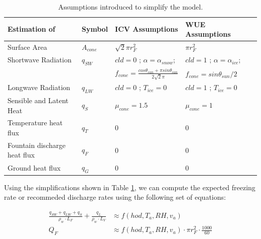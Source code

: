 \documentclass[tc, manuscript]{copernicus}
\begin{document}
\begin{table}[]
\centering
\caption{Assumptions introduced to simplify the model.}
\label{tab:assumptions}
\begin{tabular}{@{}lllll@{}}
\toprule
\textbf{Estimation of} & \textbf{Symbol} & \textbf{ICV Assumptions} & \textbf{WUE Assumptions} & \\ \midrule
\multicolumn{1}{|l}{Surface Area}        & $A_{cone}$ & $ \sqrt{2} \pi r_{F}^2$ & $\pi r_{F}^2$ & \multicolumn{1}{l|}{} \\ \midrule
\multicolumn{1}{|l}{Shortwave Radiation} & $q_{SW}$ & $cld = 0$ ; $\alpha=\alpha_{snow}$; & $cld = 1$ ;
$\alpha=\alpha_{ice}$; & \multicolumn{1}{l|}{} \\ 
\multicolumn{1}{|l}{ } &  & $f_{cone} = \frac{cos \theta_{sun} + \pi sin \theta_{sun}}{2\sqrt{2}\pi}$  & $f_{cone} = sin \theta_{sun} / 2$ & \multicolumn{1}{l|}{} \\ \midrule
\multicolumn{1}{|l}{Longwave Radiation}  & $q_{LW}$ & $cld = 0$ ; $T_{ice} = 0$ & $cld = 1$ ; $T_{ice} = 0$ & \multicolumn{1}{l|}{} \\ \midrule
\multicolumn{1}{|l}{Sensible and Latent Heat}       & $q_{S}$ &$\mu_{cone} = 1.5$  & $\mu_{cone} = 1$ & \multicolumn{1}{l|}{} \\ \midrule
\multicolumn{1}{|l}{Temperature heat flux} & $q_{T}$ & 0 & 0 & \multicolumn{1}{l|}{} \\ \midrule
\multicolumn{1}{|l}{Fountain discharge heat flux} & $q_{F}$ & 0 & 0 & \multicolumn{1}{l|}{} \\ \midrule
\multicolumn{1}{|l}{Ground heat flux}    & $q_{G}$ & 0 & 0 & \multicolumn{1}{l|}{} \\ \bottomrule
\end{tabular}
\end{table}

Using the simplifications shown in Table \ref{tab:assumptions}, we can compute the expected freezing rate or
recommeded discharge rates using the following set of equations:

\begin{subequations}
	\begin{align}
		\label{eqn:T}
   \frac{q_{SW} + q_{LW} + q_{S}}{\rho_w \cdot L_F} + \frac{q_L}{\rho_w \cdot L_V} & \approx f(hod, T_a, RH,
   v_a) \\
		\label{eqn:auto}
  Q_{F} & \approx f(hod, T_a, RH, v_a) \cdot \pi r_{F}^2 \cdot
  \frac{1000}{60}
	\end{align}
\end{subequations}
\end{document}
